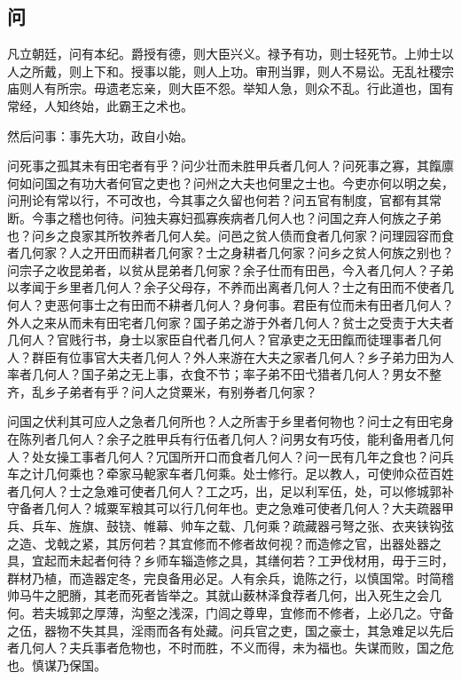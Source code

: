 \documentclass[]{article}
\begin{document}
\hypertarget{header-n371}{%
\subsection{问}\label{header-n371}}

凡立朝廷，问有本纪。爵授有德，则大臣兴义。禄予有功，则士轻死节。上帅士以人之所戴，则上下和。授事以能，则人上功。审刑当罪，则人不易讼。无乱社稷宗庙则人有所宗。毋遗老忘亲，则大臣不怨。举知人急，则众不乱。行此道也，国有常经，人知终始，此霸王之术也。

然后问事：事先大功，政自小始。

问死事之孤其未有田宅者有乎？问少壮而未胜甲兵者几何人？问死事之寡，其餼廪何如问国之有功大者何官之吏也？问州之大夫也何里之士也。今吏亦何以明之矣，问刑论有常以行，不可改也，今其事之久留也何若？问五官有制度，官都有其常断。今事之稽也何待。问独夫寡妇孤寡疾病者几何人也？问国之弃人何族之子弟也？问乡之良家其所牧养者几何人矣。问邑之贫人债而食者几何家？问理园容而食者几何家？人之开田而耕者几何家？士之身耕者几何家？问乡之贫人何族之别也？问宗子之收昆弟者，以贫从昆弟者几何家？余子仕而有田邑，今入者几何人？子弟以孝闻于乡里者几何人？余子父母存，不养而出离者几何人？士之有田而不使者几何人？吏恶何事士之有田而不耕者几何人？身何事。君臣有位而未有田者几何人？外人之来从而未有田宅者几何家？国子弟之游于外者几何人？贫士之受责于大夫者几何人？官贱行书，身士以家臣自代者几何人？官承吏之无田餼而徒理事者几何人？群臣有位事官大夫者几何人？外人来游在大夫之家者几何人？乡子弟力田为人率者几何人？国子弟之无上事，衣食不节；率子弟不田弋猎者几何人？男女不整齐，乱乡子弟者有乎？问人之贷粟米，有别券者几何家？

问国之伏利其可应人之急者几何所也？人之所害于乡里者何物也？问士之有田宅身在陈列者几何人？余子之胜甲兵有行伍者几何人？问男女有巧伎，能利备用者几何人？处女操工事者几何人？冗国所开口而食者几何人？问一民有几年之食也？问兵车之计几何乘也？牵家马軶家车者几何乘。处士修行。足以教人，可使帅众莅百姓者几何人？士之急难可使者几何人？工之巧，出，足以利军伍，处，可以修城郭补守备者几何人？城粟军粮其可以行几何年也。吏之急难可使者几何人？大夫疏器甲兵、兵车、旌旗、鼓铙、帷幕、帅车之载、几何乘？疏藏器弓弩之张、衣夹铗钩弦之造、戈戟之紧，其厉何若？其宜修而不修者故何视？而造修之官，出器处器之具，宜起而未起者何待？乡师车辎造修之具，其缮何若？工尹伐材用，毋于三时，群材乃植，而造器定冬，完良备用必足。人有余兵，诡陈之行，以慎国常。时简稽帅马牛之肥膌，其老而死者皆举之。其就山薮林泽食荐者几何，出入死生之会几何。若夫城郭之厚薄，沟壑之浅深，门闾之尊卑，宜修而不修者，上必几之。守备之伍，器物不失其具，淫雨而各有处藏。问兵官之吏，国之豪士，其急难足以先后者几何人？夫兵事者危物也，不时而胜，不义而得，未为福也。失谋而败，国之危也。慎谋乃保国。
\end{document}
